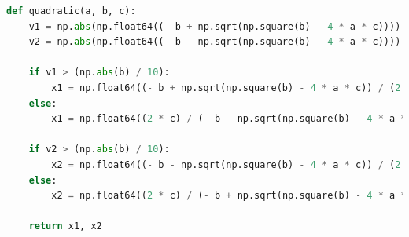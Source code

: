\documentclass[11pt]{article}
\begin{document}
\lstset{style = mystyle}
\begin{lstlisting}[language=Python]
def quadratic(a, b, c):
    v1 = np.abs(np.float64((- b + np.sqrt(np.square(b) - 4 * a * c))))
    v2 = np.abs(np.float64((- b - np.sqrt(np.square(b) - 4 * a * c))))
    
    if v1 > (np.abs(b) / 10):
        x1 = np.float64((- b + np.sqrt(np.square(b) - 4 * a * c)) / (2 * a))
    else:
        x1 = np.float64((2 * c) / (- b - np.sqrt(np.square(b) - 4 * a * c)))
        
    if v2 > (np.abs(b) / 10):
        x2 = np.float64((- b - np.sqrt(np.square(b) - 4 * a * c)) / (2 * a))
    else:
        x2 = np.float64((2 * c) / (- b + np.sqrt(np.square(b) - 4 * a * c)))
        
    return x1, x2
\end{lstlisting}
\end{document}

